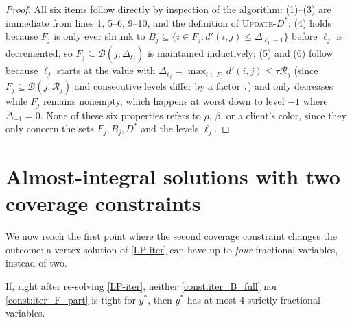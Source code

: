 \documentclass[a4paper,11pt]{article}
\begin{document}
\begin{proof}
All six items follow directly by inspection of the algorithm: (1)--(3)
are immediate from lines 1, 5--6, 9--10, and the definition of
\textsc{Update-$D^*$}; (4) holds because $F_j$ is only ever shrunk to
$B_j\subseteq\{i\in F_j : d'(i,j)\le\Delta_{\ell_j-1}\}$ before $\ell_j$
is decremented, so $F_j\subseteq\mathcal B(j,\Delta_{\ell_j})$ is
maintained inductively; (5) and (6) follow because $\ell_j$ starts at the
value with $\Delta_{\ell_j}=\max_{i\in F_j} d'(i,j)\le\tau \mathcal{R}_j$ (since
$F_j\subseteq\mathcal B(j,\mathcal{R}_j)$ and consecutive levels differ by a factor
$\tau$) and only decreases while $F_j$ remains nonempty, which happens at
worst down to level $-1$ where $\Delta_{-1}=0$. None of these six
properties refers to $\rho$, $\beta$, or a client's color, since they
only concern the sets $F_j,B_j,D^*$ and the levels $\ell_j$.
\end{proof}

\section{Almost-integral solutions with two coverage constraints}
\label{sec:fractional-count}

We now reach the first point where the second coverage constraint
changes the outcome: a vertex solution of \eqref{LP-iter} can have up to
\emph{four} fractional variables, instead of two.

\begin{lemma}
\label{lem:almost_integral}
If, right after re-solving \eqref{LP-iter}, neither
\eqref{const:iter_B_full} nor \eqref{const:iter_F_part} is tight for
$y^*$, then $y^*$ has at most $4$ strictly fractional variables.
\end{lemma}
\end{document}
